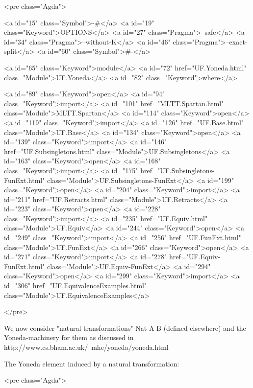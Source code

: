 <pre class="Agda">

<a id="15" class="Symbol">{-#</a> <a id="19" class="Keyword">OPTIONS</a> <a id="27" class="Pragma">--safe</a> <a id="34" class="Pragma">--without-K</a> <a id="46" class="Pragma">--exact-split</a> <a id="60" class="Symbol">#-}</a>

<a id="65" class="Keyword">module</a> <a id="72" href="UF.Yoneda.html" class="Module">UF.Yoneda</a> <a id="82" class="Keyword">where</a>

<a id="89" class="Keyword">open</a> <a id="94" class="Keyword">import</a> <a id="101" href="MLTT.Spartan.html" class="Module">MLTT.Spartan</a>
<a id="114" class="Keyword">open</a> <a id="119" class="Keyword">import</a> <a id="126" href="UF.Base.html" class="Module">UF.Base</a>
<a id="134" class="Keyword">open</a> <a id="139" class="Keyword">import</a> <a id="146" href="UF.Subsingletons.html" class="Module">UF.Subsingletons</a>
<a id="163" class="Keyword">open</a> <a id="168" class="Keyword">import</a> <a id="175" href="UF.Subsingletons-FunExt.html" class="Module">UF.Subsingletons-FunExt</a>
<a id="199" class="Keyword">open</a> <a id="204" class="Keyword">import</a> <a id="211" href="UF.Retracts.html" class="Module">UF.Retracts</a>
<a id="223" class="Keyword">open</a> <a id="228" class="Keyword">import</a> <a id="235" href="UF.Equiv.html" class="Module">UF.Equiv</a>
<a id="244" class="Keyword">open</a> <a id="249" class="Keyword">import</a> <a id="256" href="UF.FunExt.html" class="Module">UF.FunExt</a>
<a id="266" class="Keyword">open</a> <a id="271" class="Keyword">import</a> <a id="278" href="UF.Equiv-FunExt.html" class="Module">UF.Equiv-FunExt</a>
<a id="294" class="Keyword">open</a> <a id="299" class="Keyword">import</a> <a id="306" href="UF.EquivalenceExamples.html" class="Module">UF.EquivalenceExamples</a>

</pre>

We now consider "natural transformations" Nat A B (defined elsewhere)
and the Yoneda-machinery for them as discussed in
http://www.cs.bham.ac.uk/~mhe/yoneda/yoneda.html

The Yoneda element induced by a natural transformation:

<pre class="Agda">

